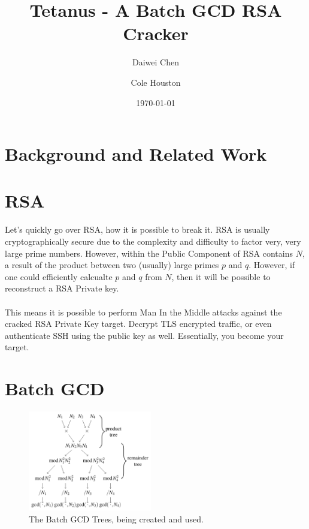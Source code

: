 \documentclass[10pt, letterpaper]{article}
\title{Tetanus - A Batch GCD RSA Cracker}
\author{Daiwei Chen \and Cole Houston}
\date{\today}
\begin{document}
\maketitle
\begin{abstract}

\end{abstract}

\section{Background and Related Work}


\section{RSA}
Let's quickly go over RSA, how it is possible to break it. RSA is usually cryptographically secure due to the complexity and difficulty to factor very, very large prime numbers. However, within the Public Component of RSA contains $N$, a result of the product between two (usually) large primes $p$ and $q$. However, if one could efficiently calcualte $p$ and $q$ from $N$, then it will be possible to reconstruct a RSA Private key. \\
\\
This means it is possible to perform Man In the Middle attacks against the cracked RSA Private Key target. Decrypt TLS encrypted traffic, or even authenticate SSH using the public key as well. Essentially, you become your target.

\section{Batch GCD}

\begin{figure}
  \begin{center}
    \includegraphics[width=0.48\textwidth]{batch-gcd-tree.png}
  \end{center}
  \caption{The Batch GCD Trees, being created and used.}
\end{figure}
\end{document}
